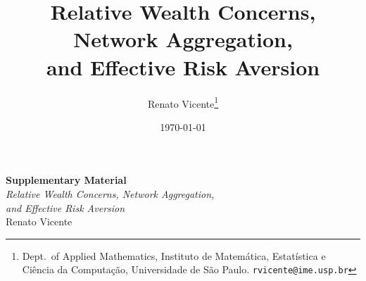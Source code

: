 \documentclass[12pt]{article}
\title{Relative Wealth Concerns, Network Aggregation,\\
and Effective Risk Aversion}
\author{Renato Vicente\thanks{Dept.\ of Applied Mathematics, Instituto de
Matem\'atica, Estat\'istica e Ci\^encia da Computa\c{c}\~ao, Universidade de
S\~ao Paulo. \texttt{rvicente@ime.usp.br}}}
\date{\today}
\theoremstyle{definition}
\theoremstyle{remark}
\begin{document}
\maketitle



\clearpage
\setcounter{section}{0}
\setcounter{table}{0}
\setcounter{equation}{0}
\renewcommand{\thesection}{S\arabic{section}}
\renewcommand{\thetable}{S\arabic{table}}
\renewcommand{\theequation}{S\arabic{equation}}

\begin{center}
{\Large\bfseries Supplementary Material}\\[2ex]
{\large\itshape Relative Wealth Concerns, Network Aggregation,\\
and Effective Risk Aversion}\\[1ex]
Renato Vicente
\end{center}
\bigskip


\end{document}
